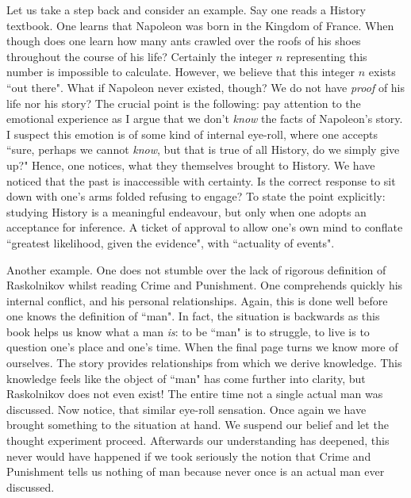 \documentclass[12pt]{article}
\theoremstyle{plain}
\theoremstyle{definition}
\begin{document}
	Let us take a step back and consider an example. Say one reads a History textbook. One learns that Napoleon was born in the Kingdom of France. When though does one learn how many ants crawled over the roofs of his shoes throughout the course of his life? Certainly the integer $n$ representing this number is impossible to calculate. However, we believe that this integer $n$ exists ``out there". What if Napoleon never existed, though? We do not have \emph{proof} of his life nor his story? The crucial point is the following: pay attention to the emotional experience as I argue that we don't \emph{know} the facts of Napoleon's story. I suspect this emotion is of some kind of internal eye-roll, where one accepts ``sure, perhaps we cannot \emph{know}, but that is true of all History, do we simply give up?" Hence, one notices, what they themselves brought to History. We have noticed that the past is inaccessible with certainty. Is the correct response to sit down with one's arms folded refusing to engage? To state the point explicitly: studying History is a meaningful endeavour, but only when one adopts an acceptance for inference.  A ticket of approval to allow one's own mind to conflate ``greatest likelihood, given the evidence", with ``actuality of events".
	
	Another example. One does not stumble over the lack of rigorous definition of Raskolnikov whilst reading Crime and Punishment. One comprehends quickly his internal conflict, and his personal relationships. Again, this is done well before one knows the definition of ``man". In fact, the situation is backwards as this book helps us know what a man \emph{is}: to be ``man" is to struggle, to live is to question one's place and one's time. When the final page turns we know more of ourselves. The story provides relationships from which we derive knowledge. This knowledge feels like the object of ``man" has come further into clarity, but Raskolnikov does not even exist! The entire time not a single actual man was discussed. Now notice, that similar eye-roll sensation. Once again we have brought something to the situation at hand. We suspend our belief and let the thought experiment proceed. Afterwards our understanding has deepened, this never would have happened if we took seriously the notion that Crime and Punishment tells us nothing of man because never once is an actual man ever discussed.
	
\end{document}

